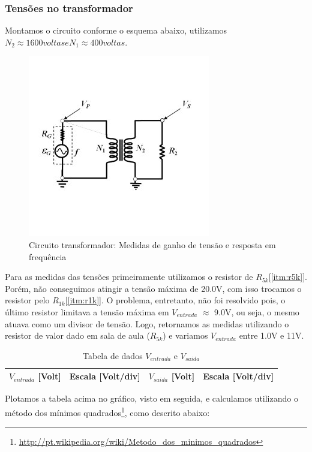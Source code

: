 \documentclass[12pt,letterpaper]{article}
\begin{document}
\subsubsection{Tensões no transformador} \label{itm:ttrans} 
Montamos o circuito conforme o esquema abaixo, utilizamos $N_{2} \approx 1600 voltas e N_{1} \approx 400 voltas$.\\
\begin{figure}[!htb]
  \centering
  \label{itransf}
  \includegraphics[scale=0.7]{img/transf.jpg}
  \caption{Circuito transformador: Medidas de ganho de tensão e resposta em frequência}
\end{figure}
Para as medidas das tensões primeiramente utilizamos o resistor de $R_{5k}$[\ref{itm:r5k}]. Porém, não conseguimos atingir a tensão máxima de 20.0V, com isso trocamos o resistor pelo $R_{1k}$[\ref{itm:r1k}]. O problema, entretanto, não foi resolvido pois, o último resistor limitava a tensão máxima em $V_{entrada}$ $\approx$ 9.0V, ou seja, o mesmo atuava como um divisor de tensão. Logo, retornamos as medidas utilizando o resistor de valor dado em sala de aula ($R_{5k}$) e variamos $V_{entrada}$ entre 1.0V e 11V. 
\begin{table}
  \centering
  \begin{tabular}{|c|c|c|c|}
    \hline
    $V_{entrada}$ [Volt] & Escala [Volt/div] & $V_{saida}$ [Volt] & Escala [Volt/div]\\
    \hline
        
    \hline
  \end{tabular}
  \caption{Tabela de dados $V_{entrada}$ e $V_{saida}$}
\end{table}
Plotamos a tabela acima no gráfico, visto em seguida, e calculamos utilizando o método dos mínimos quadrados\footnote{\url{http://pt.wikipedia.org/wiki/Metodo_dos_minimos_quadrados}}, como descrito abaixo:
\end{document}
